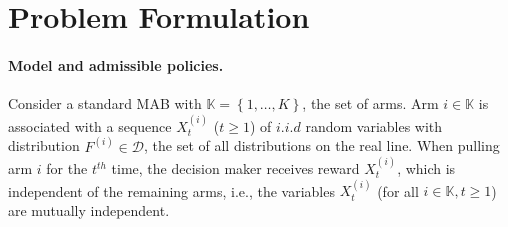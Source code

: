 \documentclass[final,12pt]{colt2018}
\newcommand{\prn}[1]{\left( #1 \right)}
\newcommand{\brc}[1]{\left\lbrace #1 \right\rbrace}
\newcommand{\Xti}[2][i]{X_{#2}^{(#1)}}
\newcommand{\Fi}[1][i]{F^{\prn{{#1}}}}
\newcommand{\DistSet}{\mathcal{D}}
\newcommand{\actionSet}{\mathds{K}}
\begin{document}
	
	
	
	
	
	
	
	
	
	
	
	
	
	
	
	
	
	


















	
	
	

	
	
	
	





































	\section{Problem Formulation} \label{sec:formulation}
	\paragraph{Model and admissible policies.} Consider a standard MAB with $\actionSet = \brc{1, \ldots, K}$, the set of arms. Arm $i \in \actionSet$ is associated with a sequence $\Xti{t}$ ($t \ge 1$) of $i.i.d$ random variables with distribution $\Fi \in \DistSet$, the set of all distributions on the real line. When pulling arm $i$ for the $t^{th}$ time, the decision maker receives reward $\Xti{t}$, which is independent of the remaining arms, i.e., the variables $\Xti{t}$ (for all $i \in \actionSet, t \ge 1$) are mutually independent. 
	
\end{document}
